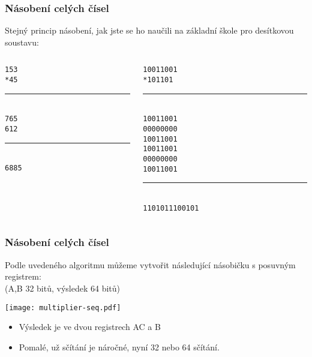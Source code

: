 \documentclass{beamer}
\begin{document}
\begin{frame}
\frametitle{Násobení celých čísel}

Stejný princip násobení, jak jste se ho naučili na základní škole pro desítkovou soustavu:
\begin{columns}
\begin{column}{0.4\textwidth}
\texttt{\phantom{xxx}153}\\
\texttt{\phantom{xxx}*45}\\
\vspace{-8pt}
\rule[0pt]{1.5cm}{0.1pt}\\
\texttt{\phantom{xxx}765}\\
\texttt{\phantom{xx}612 }\\
\vspace{-8pt}
\rule[0pt]{1.5cm}{0.1pt}\\
\texttt{\phantom{xx}6885}\\
\end{column}
\hfill
\begin{column}{0.4\textwidth}
\texttt{\phantom{xxxxxx}10011001}\\
\texttt{\phantom{xxxxxxx}*101101}\\
\vspace{-8pt}
\rule[0pt]{3cm}{0.4pt}\\
\texttt{\phantom{xxxxxx}10011001}\\
\texttt{\phantom{xxxxx}00000000}\\
\texttt{\phantom{xxxx}10011001}\\
\texttt{\phantom{xxx}10011001}\\
\texttt{\phantom{xx}00000000}\\
\texttt{\phantom{x}10011001}\\
\vspace{-8pt}
\rule[0pt]{3cm}{0.4pt}\\
\texttt{\phantom{x}1101011100101}\\
\end{column}
\end{columns}

\end{frame}

\begin{frame}
\frametitle{Násobení celých čísel}

Podle uvedeného algoritmu můžeme vytvořit následující násobičku s posuvným registrem:\\
(A,B 32 bitů, výsledek 64 bitů)
\begin{center}
\texttt{[image: multiplier-seq.pdf]}
\end{center}
\begin{itemize}
\item Výsledek je ve dvou registrech AC a B 
\item Pomalé, už sčítání je náročné, nyní 32 nebo 64 sčítání.
\end{itemize}
\end{frame}
\end{document}
